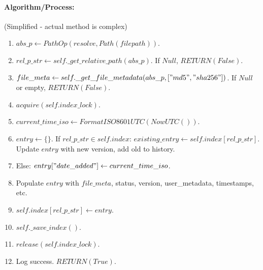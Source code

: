 \documentclass{article}
\begin{document}
\paragraph{Algorithm/Process:} (Simplified - actual method is complex)
\begin{enumerate}
    \item $abs\_p \leftarrow PathOp(resolve, Path(filepath))$.
    \item $rel\_p\_str \leftarrow self.\_get\_relative\_path(abs\_p)$. If $Null$, $RETURN(False)$.
    \item $file\_meta \leftarrow self.\_get\_file\_metadata(abs\_p, ["md5", "sha256"])$. If $Null$ or empty, $RETURN(False)$.
    \item $acquire(self.index\_lock)$.
    \item $current\_time\_iso \leftarrow FormatISO8601UTC(NowUTC())$.
    \item $entry \leftarrow \{\}$. If $rel\_p\_str \in self.index$: $existing\_entry \leftarrow self.index[rel\_p\_str]$. Update $entry$ with new version, add old to history.
    \item Else: $entry["date\_added"] \leftarrow current\_time\_iso$.
    \item Populate $entry$ with $file\_meta$, status, version, user\_metadata, timestamps, etc.
    \item $self.index[rel\_p\_str] \leftarrow entry$.
    \item $self.\_save\_index()$.
    \item $release(self.index\_lock)$.
    \item Log success. $RETURN(True)$.
\end{enumerate}
\end{document}
